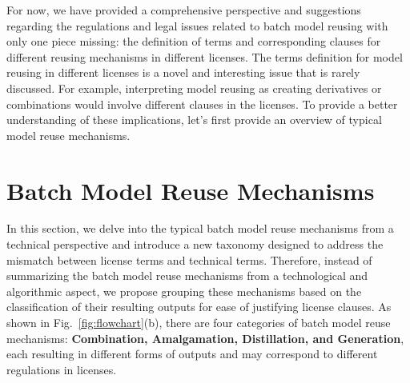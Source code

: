 For now, we have provided a comprehensive perspective and suggestions regarding the regulations and legal issues related to batch model reusing with only one piece missing: the definition of terms and corresponding clauses for different reusing mechanisms in different licenses.
The terms definition for model reusing in different licenses is a novel and interesting issue that is rarely discussed. 
For example, interpreting model reusing as creating derivatives or combinations would involve different clauses in the licenses.
To provide a better understanding of these implications, let's first provide an overview of typical model reuse mechanisms.

\section{Batch Model Reuse Mechanisms}
\label{sec:taxonomy}
In this section, we delve into the typical batch model reuse mechanisms from a technical perspective and introduce a new taxonomy designed to address the mismatch between license terms and technical terms.
Therefore, instead of summarizing the batch model reuse mechanisms from a technological and algorithmic aspect, we propose grouping these mechanisms based on the classification of their resulting outputs for ease of justifying license clauses.
As shown in Fig.~\ref{fig:flowchart}(b), there are four categories of batch model reuse mechanisms: \textbf{Combination, Amalgamation, Distillation, and Generation}, each resulting in different forms of outputs and may correspond to different regulations in licenses.

